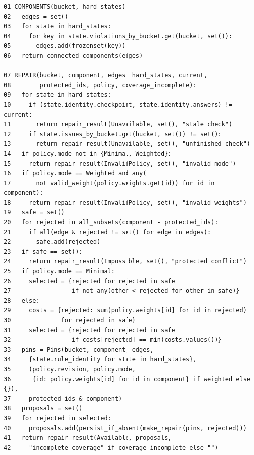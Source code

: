 \documentclass[11pt]{article}
\begin{document}
\begin{algorithm}[tbp]
{\footnotesize
\begin{verbatim}
01 COMPONENTS(bucket, hard_states):
02   edges = set()
03   for state in hard_states:
04     for key in state.violations_by_bucket.get(bucket, set()):
05       edges.add(frozenset(key))
06   return connected_components(edges)

07 REPAIR(bucket, component, edges, hard_states, current,
08        protected_ids, policy, coverage_incomplete):
09   for state in hard_states:
10     if (state.identity.checkpoint, state.identity.answers) != current:
11       return repair_result(Unavailable, set(), "stale check")
12     if state.issues_by_bucket.get(bucket, set()) != set():
13       return repair_result(Unavailable, set(), "unfinished check")
14   if policy.mode not in {Minimal, Weighted}:
15     return repair_result(InvalidPolicy, set(), "invalid mode")
16   if policy.mode == Weighted and any(
17       not valid_weight(policy.weights.get(id)) for id in component):
18     return repair_result(InvalidPolicy, set(), "invalid weights")
19   safe = set()
20   for rejected in all_subsets(component - protected_ids):
21     if all(edge & rejected != set() for edge in edges):
22       safe.add(rejected)
23   if safe == set():
24     return repair_result(Impossible, set(), "protected conflict")
25   if policy.mode == Minimal:
26     selected = {rejected for rejected in safe
27                 if not any(other < rejected for other in safe)}
28   else:
29     costs = {rejected: sum(policy.weights[id] for id in rejected)
30              for rejected in safe}
31     selected = {rejected for rejected in safe
32                 if costs[rejected] == min(costs.values())}
33   pins = Pins(bucket, component, edges,
34     {state.rule_identity for state in hard_states},
35     (policy.revision, policy.mode,
36      {id: policy.weights[id] for id in component} if weighted else {}),
37     protected_ids & component)
38   proposals = set()
39   for rejected in selected:
40     proposals.add(persist_if_absent(make_repair(pins, rejected)))
41   return repair_result(Available, proposals,
42     "incomplete coverage" if coverage_incomplete else "")
\end{verbatim}}
\caption{COMPONENTS and REPAIR propose acceptance repairs for one conflict component.}\label{alg:repair}
\end{algorithm}
\end{document}
